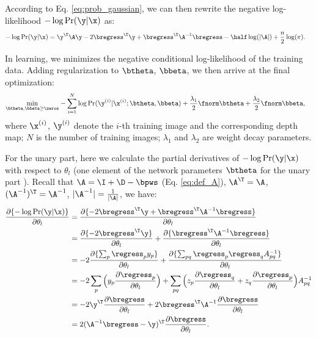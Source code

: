 %
%
According to Eq. \eqref{eq:prob_gaussian}, we can then rewrite the negative log-likelihood $-\log\Pr(\y|\x)$ as:
\begin{align} \label{eq:log-likelihood}
-\log\Pr(\y|\x)&= \y^\T \A \y - 2\bregress^\T \y + \bregress ^\T \A^{-1} \bregress - \half\log(|\A|) + \frac{n}{2}\log(\pi).
\end{align}


In learning, we minimizes the negative conditional log-likelihood of the training data. Adding regularization to $\btheta$, $\bbeta$, we then arrive at the final optimization:
\begin{align} \label{eq:ccrf_final}
\min_{\btheta, \bbeta \geq \zeros} &-\sum_{i=1}^N \log\Pr(\y^{(i)} | \x^{(i)}; \btheta, \bbeta) + \frac{\lambda_1}{2} \fnorm \btheta + \frac{\lambda_2}{2} \fnorm \bbeta,
\end{align}
where $\x^{(i)}$, $\y^{(i)}$ denote the $i$-th training image and the corresponding depth map; $N$ is the number of training images; $\lambda_1$ and $\lambda_2$ are weight decay parameters.



For the unary part,
here we calculate the partial derivatives of $-\log\Pr(\y|\x)$ with respect to $\theta_l$ (one element of the network parameters $\btheta$ for the unary part ). Recall that $\A = \I+ \D - \bpws$ (Eq. \eqref{eq:def_A}), $\A^{\T}=\A$, $(\A^{-1})^{\T}=\A^{-1}$, $|\A^{-1}|=\frac{1}{|\A|}$, we have:
\begin{align}  \label{eq:derive_z}
\frac{\partial \{ -\log\Pr(\y|\x)\} }{\partial \theta_l} &= \frac{\partial \{-2\bregress^\T \y + \bregress ^\T \A^{-1} \bregress\}}{\partial \theta_l}   \\ \notag
&= \frac{\partial \{-2\bregress^\T \y \} } {\partial \theta_l} + \frac{\partial \{ \bregress ^\T \A^{-1} \bregress\}}{\partial \theta_l}   \\ \notag
&= -2 \frac{\partial \{ \sum_p \regress_p y_p \} } {\partial \theta_l} + \frac{\partial \{ \sum_{pq} \regress_p \regress_q A^{-1}_{pq} \}}{\partial \theta_l}   \\ \notag
&= -2 \sum_p \Big ( y_p\frac{\partial \regress_p } {\partial \theta_l} \Big ) + \sum_{pq} \Big ( z_p \frac{\partial  \regress_q} {\partial \theta_l} + z_q \frac{\partial  \regress_p} {\partial \theta_l} \Big ) A^{-1}_{pq} \\ \notag
&= -2 \y^{\T} \frac{\partial \bregress } {\partial \theta_l} + 2\bregress^{\T} \A^{-1} \frac{\partial \bregress } {\partial \theta_l}\\ \notag
&= 2 (\A^{-1} \bregress - \y)^{\T} \frac{\partial \bregress}{\partial \theta_l} .
\end{align}



